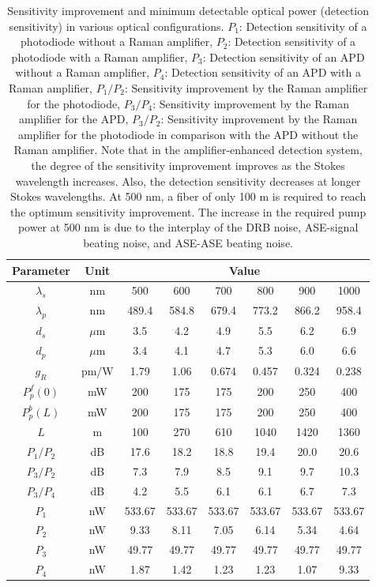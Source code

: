 \documentclass[10pt,letterpaper]{article}
\begin{document}
\begin{table}[t]
\begin{centering}
\begin{tabular}{|c|c|c|c|c|c|c|c|} \hline
Parameter & Unit & \multicolumn{6}{|c|}{Value} \\ \hline\hline
$\lambda_s$ & nm & 500 & 600 & 700 & 800 & 900 & 1000 \\ \hline
$\lambda_p$ & nm & 489.4 & 584.8 & 679.4 & 773.2 & 866.2 & 958.4 \\ \hline
$d_s$ & $\mu$m & 3.5 & 4.2 & 4.9 & 5.5 & 6.2 & 6.9 \\ \hline
$d_p$ & $\mu$m & 3.4 & 4.1 & 4.7 & 5.3 & 6.0 & 6.6 \\ \hline
$g_R$ & pm/W & 1.79 & 1.06 & 0.674 & 0.457 & 0.324 & 0.238 \\ \hline
$P_p^f(0)$ &mW & 200 & 175 & 175 & 200 & 250 & 400 \\ \hline
$P_p^b(L)$ &mW & 200 & 175 & 175 & 200 & 250 & 400 \\ \hline
$L$ &m & 100 & 270 & 610 & 1040 & 1420 & 1360 \\ \hline
$P_1/P_2$ &dB & 17.6 & 18.2 & 18.8 & 19.4 & 20.0 & 20.6 \\ \hline
$P_3/P_2$ &dB  & 7.3 & 7.9 & 8.5 & 9.1 & 9.7 & 10.3 \\ \hline
$P_3/P_4$ &dB  & 4.2 & 5.5 & 6.1 & 6.1 & 6.7 & 7.3 \\ \hline
$P_1$ &nW  & 533.67 & 533.67 & 533.67 & 533.67 & 533.67 & 533.67 \\ \hline
$P_2$ &nW  & 9.33 & 8.11 & 7.05 & 6.14 & 5.34 & 4.64 \\ \hline
$P_3$ &nW  & 49.77 & 49.77 & 49.77 & 49.77 & 49.77 & 49.77 \\ \hline
$P_4$ &nW  & 1.87 & 1.42 & 1.23 & 1.23 & 1.07 & 9.33 \\ \hline
\end{tabular}
\caption{Sensitivity improvement and minimum detectable optical power (detection sensitivity) in various optical configurations. $P_1$: Detection sensitivity of a photodiode without a Raman amplifier, $P_2$: Detection sensitivity of a photodiode with a Raman amplifier, $P_3$: Detection sensitivity of an APD without a Raman amplifier, $P_4$: Detection sensitivity of an APD with a Raman amplifier, $P_1/P_2$: Sensitivity improvement by the Raman amplifier for the photodiode, $P_3/P_4$: Sensitivity improvement by the Raman amplifier for the APD, $P_3/P_2$: Sensitivity improvement by the Raman amplifier for the photodiode in comparison with the APD without the Raman amplifier. Note that in the amplifier-enhanced detection system, the degree of the sensitivity improvement improves as the Stokes wavelength increases. Also, the detection sensitivity decreases at longer Stokes wavelengths. At 500 nm, a fiber of only 100 m is required to reach the optimum sensitivity improvement. The increase in the required pump power at 500 nm is due to the interplay of the DRB noise, ASE-signal beating noise, and ASE-ASE beating noise.}
\label{table2}
\end{centering}
\end{table}
\end{document}
